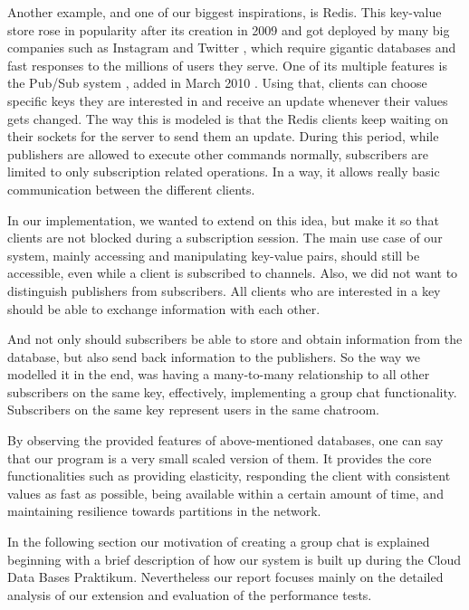 Another example, and one of our biggest inspirations, is Redis. This key-value store rose in popularity after its creation in 2009 and got deployed by many big companies such as Instagram \cite{krieger2011instagram} and Twitter \cite{yu2014twitter}, which require gigantic databases and fast responses to the millions of users they serve. One of its multiple features is the Pub/Sub system \cite{redis2020pubsub}, added in March 2010 \cite{sanfilippo2010pubsub}. Using that, clients can choose specific keys they are interested in and receive an update whenever their values gets changed. The way this is modeled is that the Redis clients keep waiting on their sockets for the server to send them an update. During this period, while publishers are allowed to execute other commands normally, subscribers are limited to only subscription related operations. In a way, it allows really basic communication between the different clients.


In our implementation, we wanted to extend on this idea, but make it so that clients are not blocked during a subscription session. The main use case of our system, mainly accessing and manipulating key-value pairs, should still be accessible, even while a client is subscribed to channels. Also, we did not want to distinguish publishers from subscribers. All clients who are interested in a key should be able to exchange information with each other.

And not only should subscribers be able to store and obtain information from the database, but also send back information to the publishers. So the way we modelled it in the end, was having a many-to-many relationship to all other subscribers on the same key, effectively, implementing a group chat functionality. Subscribers on the same key represent users in the same chatroom. 

By observing the provided features of above-mentioned databases, one can say that our program is a very small scaled version of them. It provides the core functionalities such as providing elasticity, responding the client with consistent values as fast as possible, being available within a certain amount of time, and maintaining resilience towards partitions in the network.
 
In the following section our motivation of creating a group chat is explained beginning with a brief description of how our system is built up during the Cloud Data Bases Praktikum. Nevertheless our report focuses mainly on the detailed analysis of our extension and evaluation of the performance tests.
